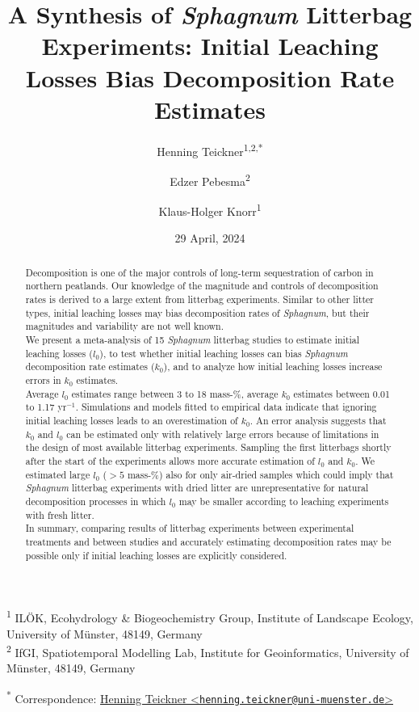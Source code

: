 \documentclass[
  12pt,
]{article}
\title{A Synthesis of \emph{Sphagnum} Litterbag Experiments: Initial Leaching Losses Bias Decomposition Rate Estimates}
\author{Henning Teickner\textsuperscript{1,2,*} \and Edzer Pebesma\textsuperscript{2} \and Klaus-Holger Knorr\textsuperscript{1}}
\date{29 April, 2024}
\begin{document}
\maketitle
\begin{abstract}
Decomposition is one of the major controls of long-term sequestration of carbon in northern peatlands. Our knowledge of the magnitude and controls of decomposition rates is derived to a large extent from litterbag experiments. Similar to other litter types, initial leaching losses may bias decomposition rates of \emph{Sphagnum}, but their magnitudes and variability are not well known.\\
We present a meta-analysis of 15 \emph{Sphagnum} litterbag studies to estimate initial leaching losses (\(l_0\)), to test whether initial leaching losses can bias \emph{Sphagnum} decomposition rate estimates (\(k_0\)), and to analyze how initial leaching losses increase errors in \(k_0\) estimates.\\
Average \(l_0\) estimates range between 3 to 18 mass-\%, average \(k_0\) estimates between 0.01 to 1.17 yr\(^{-1}\). Simulations and models fitted to empirical data indicate that ignoring initial leaching losses leads to an overestimation of \(k_0\). An error analysis suggests that \(k_0\) and \(l_0\) can be estimated only with relatively large errors because of limitations in the design of most available litterbag experiments. Sampling the first litterbags shortly after the start of the experiments allows more accurate estimation of \(l_0\) and \(k_0\). We estimated large \(l_0\) (\(>5\) mass-\%) also for only air-dried samples which could imply that \emph{Sphagnum} litterbag experiments with dried litter are unrepresentative for natural decomposition processes in which \(l_0\) may be smaller according to leaching experiments with fresh litter.\\
In summary, comparing results of litterbag experiments between experimental treatments and between studies and accurately estimating decomposition rates may be possible only if initial leaching losses are explicitly considered.
\end{abstract}

\textsuperscript{1} ILÖK, Ecohydrology \& Biogeochemistry Group, Institute of Landscape Ecology, University of Münster, 48149, Germany\\
\textsuperscript{2} IfGI, Spatiotemporal Modelling Lab, Institute for Geoinformatics, University of Münster, 48149, Germany

\textsuperscript{*} Correspondence: \href{mailto:henning.teickner@uni-muenster.de}{Henning Teickner \textless{}\href{mailto:henning.teickner@uni-muenster.de}{\nolinkurl{henning.teickner@uni-muenster.de}}\textgreater{}}
\end{document}
